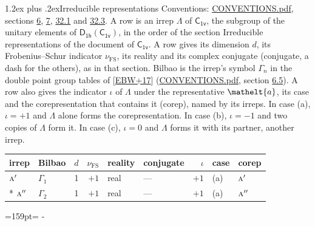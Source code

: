 \documentclass[10pt,a4paper]{article}
\makeatletter
\renewcommand\section{\@startsection{section}{1}{\z@}{-3ex plus -1ex minus -.2ex}%
  {1.2ex plus .2ex}{\normalfont\large\sffamily\bfseries\color{parttitle}}}
\newcommand{\needspace}[1]{\par\penalty-100\begingroup\dimen0=#1\relax\dimen2=\pagegoal
  \advance\dimen2-\pagetotal\ifdim\dimen0>\dimen2\relax\ifdim\dimen2>0pt\vfil\break\fi\fi
  \endgroup}
\numberwithin{equation}{section}
\newcommand{\eltfont}[1]{{\let\sigma\eltsigma\mathelt{#1}}}
\newcommand{\grp}[1]{\mathsf{#1}}
\newcommand{\irr}[1]{\text{\normalfont\scshape #1}}
\newcommand{\elt}[1]{\eltfont{#1}}
\newcommand{\fsind}{\nu_{\mathrm{FS}}}
\makeatother
\begin{document}
\section{Irreducible representations}\label{s:irreps}
Conventions: \href{../../CONVENTIONS.pdf}{CONVENTIONS.pdf}, sections \href{../../../rotation/CONVENTIONS.pdf\#conv.6}{6}, \href{../../../rotation/CONVENTIONS.pdf\#conv.7}{7}, \href{../../CONVENTIONS.pdf\#conv.32.1}{32.1} and \href{../../CONVENTIONS.pdf\#conv.32.3}{32.3}.
\leavevmode\label{n:irrep.Delta}A row is an irrep $\Lambda$ of $\grp{C_{1v}}$, the subgroup of the unitary elements of $\grp{D_{1h}}(\grp{C_{1v}})$, in the order of the section Irreducible representations of the document of \href{../../../rotation/data/pdf/C1v.pdf}{$\grp{C_{1v}}$}. \label{n:index.dimension}\label{n:index.frobenius}\label{n:head.irrep}\label{n:head.reality}\label{n:head.conjugate}A row gives its dimension $d$, its Frobenius--Schur indicator $\fsind$, its reality and its complex conjugate (conjugate, a dash for the others), as in that section. \label{n:head.bilbao}\label{n:irrep.alias.gamma}Bilbao is the irrep's symbol $\Gamma_n$ in the double point group tables of [\href{../../../REFERENCES.pdf\#ref.EBW+17}{EBW+17}] (\href{../../CONVENTIONS.pdf}{CONVENTIONS.pdf}, section \href{../../../rotation/CONVENTIONS.pdf\#conv.6.5}{6.5}). \label{n:head.case.corep}\label{n:head.corep}A row also gives the indicator $\iota$ of $\Lambda$ under the representative $\elt{a}$, its case and the corepresentation that contains it (corep), named by its irreps. In case (a), $\iota = +1$ and $\Lambda$ alone forms the corepresentation. In case (b), $\iota = -1$ and two copies of $\Lambda$ form it. In case (c), $\iota = 0$ and $\Lambda$ forms it with its partner, another irrep.
\setlength{\emergencystretch}{2em}\par\setlength{\emergencystretch}{0pt}
{\small\renewcommand{\arraystretch}{1.25}\setlength{\tabcolsep}{4pt}\begin{longtable}{@{}llrrllrll@{}}\toprule
irrep & Bilbao & $d$ & $\fsind$ & reality & conjugate & $\iota$ & case & corep\\\midrule\endhead
\bottomrule\endfoot\endlastfoot
$\irr{a}'$ & $\Gamma_{1}$ & 1 & $+1$ & real & --- & $+1$ & (a) & $\irr{a}'$\\*
$\irr{a}''$ & $\Gamma_{2}$ & 1 & $+1$ & real & --- & $+1$ & (a) & $\irr{a}''$\\
\bottomrule\end{longtable}}
\needspace{159pt}
\end{document}
